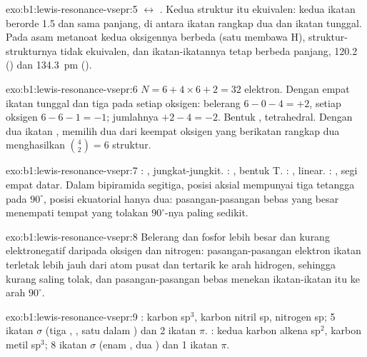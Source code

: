 \begin{solution}{exo:b1:lewis-resonance-vsepr:5}
$\leftrightarrow$
.
Kedua struktur itu ekuivalen: kedua ikatan  berorde 1.5 dan sama
panjang, di antara ikatan rangkap dua dan ikatan tunggal. Pada asam
metanoat kedua oksigennya berbeda (satu membawa H), struktur-strukturnya
tidak ekuivalen, dan ikatan-ikatannya tetap berbeda panjang, 120.2
() dan \qty{134.3}{pm} ().
\end{solution}

\begin{solution}{exo:b1:lewis-resonance-vsepr:6}
$N = 6 + 4 \times 6 + 2 = 32$ elektron. Dengan empat ikatan tunggal dan
tiga  pada setiap oksigen: belerang $6 - 0 - 4 = +2$, setiap
oksigen $6 - 6 - 1 = -1$; jumlahnya $+2 - 4 = -2$. Bentuk ,
tetrahedral. Dengan dua ikatan , memilih dua dari keempat oksigen
yang berikatan rangkap dua menghasilkan $\binom{4}{2} = 6$ struktur.
\end{solution}

\begin{solution}{exo:b1:lewis-resonance-vsepr:7}
: , jungkat-jungkit. : , bentuk T.
: , linear. : , segi empat datar.
Dalam bipiramida segitiga, posisi aksial mempunyai tiga tetangga pada
$90^\circ$, posisi ekuatorial hanya dua: pasangan-pasangan bebas yang
besar menempati tempat yang tolakan $90^\circ$-nya paling sedikit.
\end{solution}

\begin{solution}{exo:b1:lewis-resonance-vsepr:8}
Belerang dan fosfor lebih besar dan kurang elektronegatif daripada
oksigen dan nitrogen: pasangan-pasangan elektron ikatan terletak lebih
jauh dari atom pusat dan tertarik ke arah hidrogen, sehingga kurang
saling tolak, dan pasangan-pasangan bebas menekan ikatan-ikatan itu ke
arah $90^\circ$.
\end{solution}

\begin{solution}{exo:b1:lewis-resonance-vsepr:9}
: karbon  sp$^3$, karbon nitril sp, nitrogen sp;
5 ikatan $\sigma$ (tiga , , satu dalam ) dan
2 ikatan $\pi$. : kedua karbon alkena sp$^2$, karbon
metil sp$^3$; 8 ikatan $\sigma$ (enam , dua ) dan
1 ikatan $\pi$.
\end{solution}

